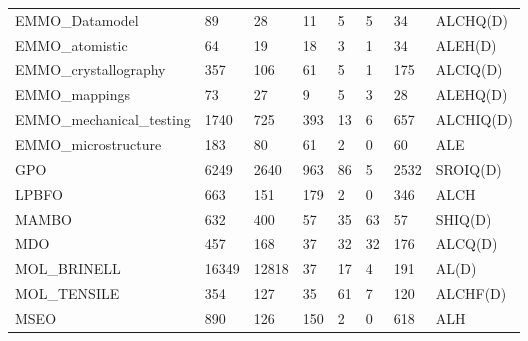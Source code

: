\begin{table}
\begin{tabular}{m{3.5cm}|m{1cm}m{1cm}m{1cm}m{1cm}m{1cm}m{1cm}m{1cm}}
EMMO\_Datamodel          &        89 &                28 &         11 &                    5 &                      5 &                       34 &         ALCHQ(D) \\
EMMO\_atomistic          &        64 &                19 &         18 &                    3 &                      1 &                       34 &          ALEH(D) \\
EMMO\_crystallography    &       357 &               106 &         61 &                    5 &                      1 &                      175 &         ALCIQ(D) \\
EMMO\_mappings           &        73 &                27 &          9 &                    5 &                      3 &                       28 &         ALEHQ(D) \\
EMMO\_mechanical\_testing &      1740 &               725 &        393 &                   13 &                      6 &                      657 &        ALCHIQ(D) \\
EMMO\_microstructure     &       183 &                80 &         61 &                    2 &                      0 &                       60 &              ALE \\
GPO                     &      6249 &              2640 &        963 &                   86 &                      5 &                     2532 &         SROIQ(D) \\
LPBFO                   &       663 &               151 &        179 &                    2 &                      0 &                      346 &             ALCH \\
MAMBO                   &       632 &               400 &         57 &                   35 &                     63 &                       57 &          SHIQ(D) \\
MDO                     &       457 &               168 &         37 &                   32 &                     32 &                      176 &          ALCQ(D) \\
MOL\_BRINELL             &     16349 &             12818 &         37 &                   17 &                      4 &                      191 &            AL(D) \\
MOL\_TENSILE             &       354 &               127 &         35 &                   61 &                      7 &                      120 &         ALCHF(D) \\
MSEO                    &       890 &               126 &        150 &                    2 &                      0 &                      618 &              ALH \\

\end{tabular}
\end{table}
